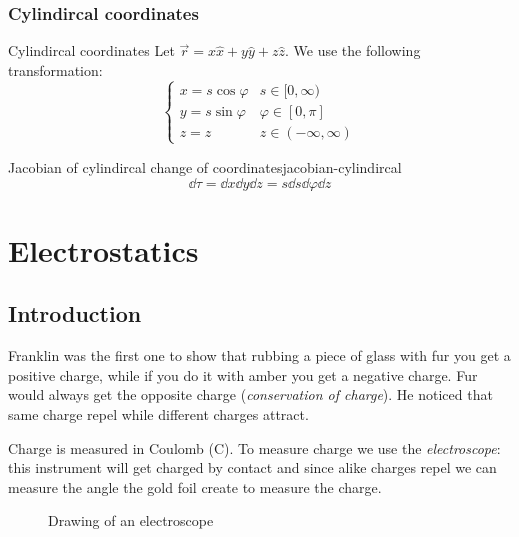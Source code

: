 \documentclass[12pt]{extarticle}
\begin{document}
\subsubsection{Cylindircal coordinates}

\begin{definition}{Cylindircal coordinates}
	Let $\vec r = x \hat x + y \hat y + z \hat z$.
	We use the following transformation:
	\begin{equation}
		\begin{cases}
			x = s \cos \varphi & s \in [0, \infty)       \\
			y = s \sin \varphi & \varphi \in [0, \pi]    \\
			z = z              & z \in (-\infty, \infty)
		\end{cases}
	\end{equation}
\end{definition}

\begin{proposition}{Jacobian of cylindircal change of coordinates}{jacobian-cylindircal}
	\begin{equation}
		\dd{\tau} = \dd{x} \dd{y} \dd{z} = s \dd{s} \dd{\varphi} \dd{z}
	\end{equation}
\end{proposition}

\section{Electrostatics}

\subsection{Introduction}

Franklin was the first one to show that rubbing a piece of glass with fur you get a positive charge, while if you do it with amber you get a negative charge.
Fur would always get the opposite charge (\emph{conservation of charge}).
He noticed that same charge repel while different charges attract.

Charge is measured in Coulomb ($\si{\coulomb}$).
To measure charge we use the \emph{electroscope}:
this instrument will get charged by contact and since alike charges repel we can measure the angle the gold foil create to measure the charge.

\begin{figure}[H]
	\centering
	
	\caption{Drawing of an electroscope}
\end{figure}
\end{document}
